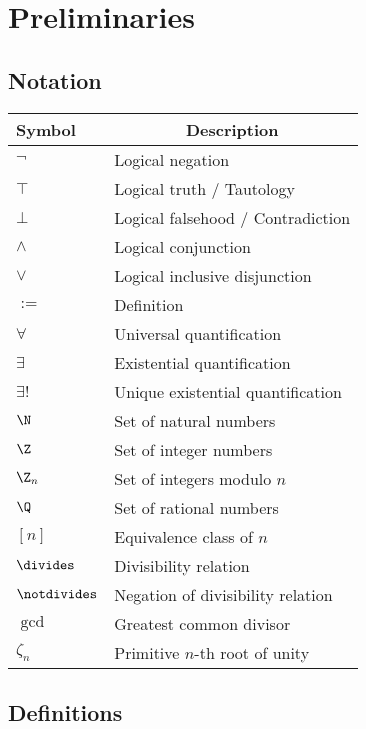 \chapter{Preliminaries}

\section{Notation}

\begin{tabular}{>{\centering}m{1.8cm} m{5.8cm}}
\toprule
\textbf{Symbol} & \multicolumn{1}{c}{\textbf{Description}} \\
\midrule
$\lnot$ & Logical negation \\
$\top$  & Logical truth / Tautology \\
$\bot$  & Logical falsehood / Contradiction \\
$\land$ & Logical conjunction \\
$\lor$ & Logical inclusive disjunction \\
$:=$   & Definition \\
$\forall$ & Universal quantification \\
$\exists$ & Existential quantification \\
$\exists!$ & Unique existential quantification \\
$\N$ & Set of natural numbers \\
$\Z$ & Set of integer numbers \\
$\Z_n$ & Set of integers modulo $n$ \\
$\Q$ & Set of rational numbers \\
$[n]$ & Equivalence class of $n$ \\
$\divides$ & Divisibility relation \\
$\notdivides$ & Negation of divisibility relation \\
$\gcd$ & Greatest common divisor \\
$\zeta_n$ & Primitive $n$-th root of unity \\
\bottomrule
\end{tabular}

\newpage

\section{Definitions}

